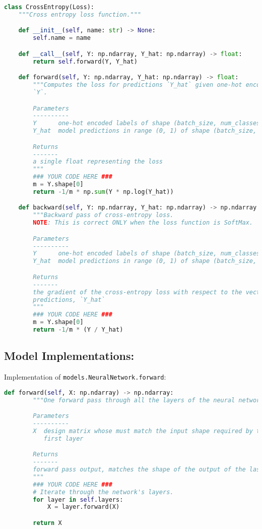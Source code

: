 \begin{lstlisting}[language=Python]
class CrossEntropy(Loss):
    """Cross entropy loss function."""

    def __init__(self, name: str) -> None:
        self.name = name

    def __call__(self, Y: np.ndarray, Y_hat: np.ndarray) -> float:
        return self.forward(Y, Y_hat)

    def forward(self, Y: np.ndarray, Y_hat: np.ndarray) -> float:
        """Computes the loss for predictions `Y_hat` given one-hot encoded labels
        `Y`.

        Parameters
        ----------
        Y      one-hot encoded labels of shape (batch_size, num_classes)
        Y_hat  model predictions in range (0, 1) of shape (batch_size, num_classes)

        Returns
        -------
        a single float representing the loss
        """
        ### YOUR CODE HERE ###
        m = Y.shape[0]
        return -1/m * np.sum(Y * np.log(Y_hat))

    def backward(self, Y: np.ndarray, Y_hat: np.ndarray) -> np.ndarray:
        """Backward pass of cross-entropy loss.
        NOTE: This is correct ONLY when the loss function is SoftMax.

        Parameters
        ----------
        Y      one-hot encoded labels of shape (batch_size, num_classes)
        Y_hat  model predictions in range (0, 1) of shape (batch_size, num_classes)

        Returns
        -------
        the gradient of the cross-entropy loss with respect to the vector of
        predictions, `Y_hat`
        """
        ### YOUR CODE HERE ###
        m = Y.shape[0]
        return -1/m * (Y / Y_hat)

\end{lstlisting}


\subsection{Model Implementations:}

Implementation of \texttt{models.NeuralNetwork.forward}:

\begin{lstlisting}[language=Python]
    def forward(self, X: np.ndarray) -> np.ndarray:
        """One forward pass through all the layers of the neural network.

        Parameters
        ----------
        X  design matrix whose must match the input shape required by the
           first layer

        Returns
        -------
        forward pass output, matches the shape of the output of the last layer
        """
        ### YOUR CODE HERE ###
        # Iterate through the network's layers.
        for layer in self.layers:
            X = layer.forward(X)

        return X

\end{lstlisting}

